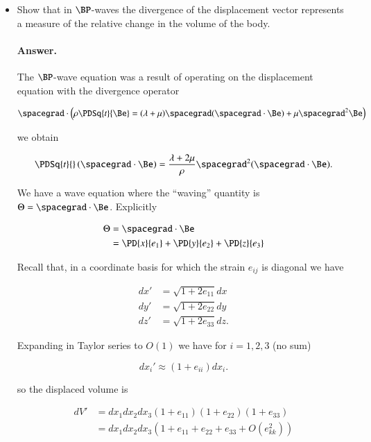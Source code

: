 \begin{itemize}
\item Show that in $\BP$-waves the divergence of the displacement vector represents a measure of the relative change in the volume of the body.

\paragraph{Answer.}
The $\BP$-wave equation was a result of operating on the displacement equation with the divergence operator

\begin{equation}\label{eqn:continuumMidTermReflection:10}
\spacegrad \cdot \left( 
\rho \PDSq{t}{\Be} = (\lambda + \mu) \spacegrad (\spacegrad \cdot \Be) + \mu \spacegrad^2 \Be
\right)
\end{equation}

we obtain

\begin{equation}\label{eqn:continuumMidTermReflection:30}
\PDSq{t}{} \left( \spacegrad \cdot \Be \right) = \frac{\lambda + 2 \mu}{\rho} \spacegrad^2 (\spacegrad \cdot \Be).
\end{equation}

We have a wave equation where the ``waving'' quantity is $\Theta = \spacegrad \cdot \Be$.  Explicitly

\begin{align*}
\Theta 
&= \spacegrad \cdot \Be \\
&= 
\PD{x}{e_1}
+\PD{y}{e_2}
+\PD{z}{e_3}
\end{align*}

Recall that, in a coordinate basis for which the strain $e_{ij}$ is diagonal we have

\begin{align}\label{eqn:continuumMidTermReflection:50}
dx' &= \sqrt{1 + 2 e_{11}} dx \\
dy' &= \sqrt{1 + 2 e_{22}} dy \\
dz' &= \sqrt{1 + 2 e_{33}} dz.
\end{align}

Expanding in Taylor series to $O(1)$ we have for $i = 1, 2, 3$ (no sum)

\begin{equation}\label{eqn:continuumMidTermReflection:70}
dx_i' \approx (1 + e_{ii}) dx_i.
\end{equation}

so the displaced volume is

\begin{align*}
dV' &= 
dx_1
dx_2
dx_3
(1 + e_{11})
(1 + e_{22})
(1 + e_{33}) \\
&=
dx_1
dx_2
dx_3
( 1  + e_{11} + e_{22} + e_{33} + O(e_{kk}^2) )
\end{align*}


\end{itemize}
